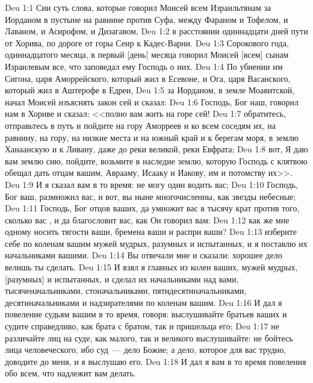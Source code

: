 \vs Deu 1:1 Сии суть слова, которые говорил Моисей всем Израильтянам за Иорданом в пустыне на равнине против Суфа, между Фараном и Тофелом, и Лаваном, и Асирофом, и Дизагавом,
\vs Deu 1:2 в расстоянии одиннадцати дней пути от Хорива, по дороге от горы Сеир к Кадес-Варни.
\vs Deu 1:3 Сорокового года, одиннадцатого месяца, в первый [день] месяца говорил Моисей [всем] сынам Израилевым все, что заповедал ему Господь о них.
\vs Deu 1:4 По убиении им Сигона, царя Аморрейского, который жил в Есевоне, и Ога, царя Васанского, который жил в Аштерофе в Едреи,
\vs Deu 1:5 за Иорданом, в земле Моавитской, начал Моисей изъяснять закон сей и сказал:
\vs Deu 1:6 Господь, Бог наш, говорил нам в Хориве и сказал: <<полно вам жить на горе сей!
\vs Deu 1:7 обратитесь, отправьтесь в путь и пойдите на гору Аморреев и ко всем соседям их, на равнину, на гору, на низкие места и на южный край и к берегам моря, в землю Ханаанскую и к Ливану, даже до реки великой, реки Евфрата;
\vs Deu 1:8 вот, Я даю вам землю сию, пойдите, возьмите в наследие землю, которую Господь с клятвою обещал дать отцам вашим, Аврааму, Исааку и Иакову, им и потомству их>>.
\vs Deu 1:9 И я сказал вам в то время: не могу один водить вас;
\vs Deu 1:10 Господь, Бог ваш, размножил вас, и вот, вы ныне многочисленны, как звезды небесные;
\vs Deu 1:11 Господь, Бог отцов ваших, да умножит вас в тысячу крат против того, сколько вас , и да благословит вас, как Он говорил вам:
\vs Deu 1:12 как же мне одному носить тягости ваши, бремена ваши и распри ваши?
\vs Deu 1:13 изберите себе по коленам вашим мужей мудрых, разумных и испытанных, и я поставлю их начальниками вашими.
\vs Deu 1:14 Вы отвечали мне и сказали: хорошее дело велишь ты сделать.
\vs Deu 1:15 И взял я главных из колен ваших, мужей мудрых, [разумных] и испытанных, и сделал их начальниками над вами, тысяченачальниками, стоначальниками, пятидесятиначальниками, десятиначальниками и надзирателями по коленам вашим.
\vs Deu 1:16 И дал я повеление судьям вашим в то время, говоря: выслушивайте братьев ваших и судите справедливо, как брата с братом, так и пришельца его;
\vs Deu 1:17 не различайте лиц на суде, как малого, так и великого выслушивайте: не бойтесь лица человеческого, ибо суд~--- дело Божие; а дело, которое для вас трудно, доводите до меня, и я выслушаю его.
\vs Deu 1:18 И дал я вам в то время повеления обо всем, что надлежит вам делать.

